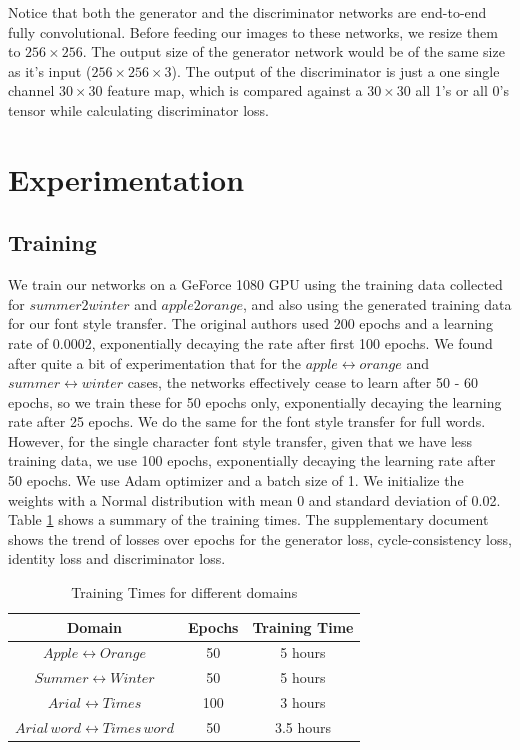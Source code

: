 \documentclass[10pt,twocolumn,letterpaper]{article}
\begin{document}
Notice that both the generator and the discriminator networks are end-to-end fully convolutional. Before 
feeding our images to these networks, we resize them to $256 \times 256$. The output size of the generator network would be of the same size as it's input ($256 \times 256 \times 3$). The output of the 
discriminator is just a one single channel $30 \times 30$ feature map, which is compared against a $30 \times 30$ all 1's or all 0's tensor while calculating discriminator loss.

\section{Experimentation}

\subsection{Training}
We train our networks on a GeForce 1080 GPU using the training data collected for $summer2winter$ and $apple2orange$, and also using the generated training data for our
font style transfer. The original authors \cite{cyclegan} used 200 epochs and a learning rate of 0.0002, exponentially decaying the rate after first 100 epochs. We found after 
quite a bit of experimentation that for the $apple \leftrightarrow orange$ and $summer \leftrightarrow winter$ cases, the networks effectively cease to learn after 50 - 60 epochs, so we train these for 50 epochs only, exponentially decaying the learning rate after 25 epochs. We do the same for the font style transfer for full words. However, for the single character font style transfer, given that we have less training data, we use 100 epochs, exponentially decaying the learning rate after 50 epochs. We use Adam optimizer and a batch size of 1. We initialize the weights with a Normal distribution with mean 0 and standard deviation of 0.02. Table \ref{table:train} shows a summary of the training times. The supplementary document shows the trend of losses
over epochs for the generator loss, cycle-consistency loss, identity loss and discriminator loss.

\begin{table}[ht!]  
\begin{center}
\begin{tabular}{ |c|c|c| } 
 \hline
 \textbf{Domain} & \textbf{Epochs} & \textbf{Training Time} \\ 
 \hline
 $Apple \leftrightarrow Orange$ & 50 & 5 hours \\ 
 \hline
 $Summer \leftrightarrow Winter$ & 50 & 5 hours \\ 
 \hline
 $Arial \leftrightarrow Times$ & 100 & 3 hours \\ 
 \hline
 $Arial \, word\leftrightarrow Times \, word$ & 50 & 3.5 hours \\ 
 \hline
\end{tabular}
\end{center}
\caption{Training Times for different domains}
\label{table:train}
\end{table}
\end{document}
